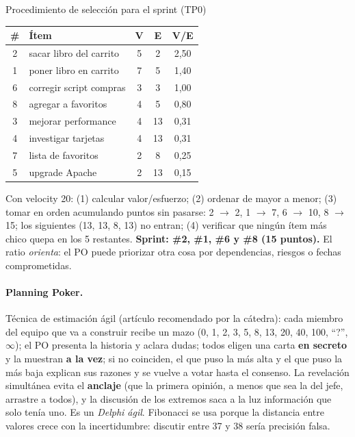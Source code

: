 \documentclass[11pt,a4paper]{article}
\begin{document}
\begin{ejemplo}{Procedimiento de selección para el sprint (TP0)}
\small
\begin{minipage}[t]{0.47\textwidth}
\begin{tabular}{@{}clccc@{}}
\toprule
\# & Ítem & V & E & V/E\\
\midrule
2 & sacar libro del carrito & 5 & 2 & 2,50\\
1 & poner libro en carrito & 7 & 5 & 1,40\\
6 & corregir script compras & 3 & 3 & 1,00\\
8 & agregar a favoritos & 4 & 5 & 0,80\\
3 & mejorar performance & 4 & 13 & 0,31\\
4 & investigar tarjetas & 4 & 13 & 0,31\\
7 & lista de favoritos & 2 & 8 & 0,25\\
5 & upgrade Apache & 2 & 13 & 0,15\\
\bottomrule
\end{tabular}
\end{minipage}\hfill
\begin{minipage}[t]{0.5\textwidth}
Con velocity 20: (1) calcular valor/esfuerzo; (2) ordenar de mayor a menor; (3) tomar en orden acumulando
puntos sin pasarse: 2 $\to$ 2, 1 $\to$ 7, 6 $\to$ 10, 8 $\to$ 15; los siguientes (13, 13, 8, 13) no entran;
(4) verificar que ningún ítem más chico quepa en los 5 restantes. \textbf{Sprint: \#2, \#1, \#6 y \#8 (15
puntos).} El ratio \emph{orienta}: el PO puede priorizar otra cosa por dependencias, riesgos o fechas
comprometidas.
\end{minipage}
\end{ejemplo}

\paragraph{Planning Poker.} Técnica de estimación ágil (artículo recomendado por la cátedra): cada miembro del equipo que va a
construir recibe un mazo (0, 1, 2, 3, 5, 8, 13, 20, 40, 100, ``?'', $\infty$); el PO presenta la historia y
aclara dudas; todos eligen una carta \textbf{en secreto} y la muestran \textbf{a la vez}; si no coinciden, el
que puso la más alta y el que puso la más baja explican sus razones y se vuelve a votar hasta el consenso. La
revelación simultánea evita el \textbf{anclaje} (que la primera opinión, a menos que sea la del jefe, arrastre
a todos), y la discusión de los extremos saca a la luz información que solo tenía uno. Es un \emph{Delphi
ágil}. Fibonacci se usa porque la distancia entre valores crece con la incertidumbre: discutir entre 37 y 38
sería precisión falsa.
\end{document}
